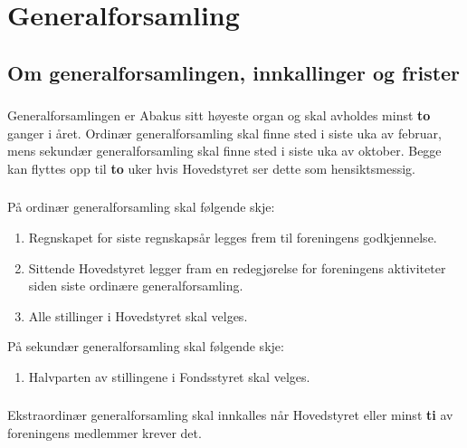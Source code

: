\section{Generalforsamling}
\subsection{Om generalforsamlingen, innkallinger og frister}
\subsubsection{}
Generalforsamlingen er Abakus sitt høyeste organ og skal avholdes minst \textbf{to} ganger i året.
 Ordinær generalforsamling skal finne sted i siste uka av februar, mens sekundær generalforsamling
skal finne sted i siste uka av oktober. Begge kan flyttes opp til \textbf{to} uker hvis Hovedstyret ser dette som hensiktsmessig.

\subsubsection{}
På ordinær generalforsamling skal følgende skje:
\begin{enumerate}[label=\alph*)]
    \item Regnskapet for siste regnskapsår legges frem til foreningens godkjennelse.
    \item Sittende Hovedstyret legger fram en redegjørelse for foreningens aktiviteter siden siste ordinære generalforsamling.
    \item Alle stillinger i Hovedstyret skal velges.
\end{enumerate}

På sekundær generalforsamling skal følgende skje:
\begin{enumerate}[label=\alph*)]
    \item Halvparten av stillingene i Fondsstyret skal velges.
\end{enumerate}

\subsubsection{}
Ekstraordinær generalforsamling skal innkalles når Hovedstyret eller minst
\textbf{ti} av foreningens medlemmer krever det.

